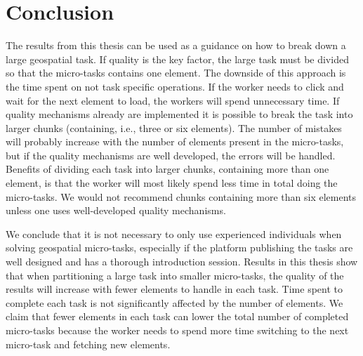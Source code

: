 \chapter{Conclusion}
The results from this thesis can be used as a guidance on how to break down a large geospatial task. If quality is the key factor, the large task must be divided so that the micro-tasks contains one element. The downside of this approach is the time spent on not task specific operations. If the worker needs to click and wait for the next element to load, the workers will spend unnecessary time. If quality mechanisms already are implemented it is possible to break the task into larger chunks (containing, i.e., three or six elements). The number of mistakes will probably increase with the number of elements present in the micro-tasks, but if the quality mechanisms are well developed, the errors will be handled. Benefits of dividing each task into larger chunks, containing more than one element, is that the worker will most likely spend less time in total doing the micro-tasks. We would not recommend chunks containing more than six elements unless one uses well-developed quality mechanisms. 

We conclude that it is not necessary to only use experienced individuals when solving geospatial micro-tasks, especially if the platform publishing the tasks are well designed and has a thorough introduction session. 
Results in this thesis show that when partitioning a large task into smaller micro-tasks, the quality of the results will increase with fewer elements to handle in each task. Time spent to complete each task is not significantly affected by the number of elements.
We claim that fewer elements in each task can lower the total number of completed micro-tasks because the worker needs to spend more time switching to the next micro-task and fetching new elements. 